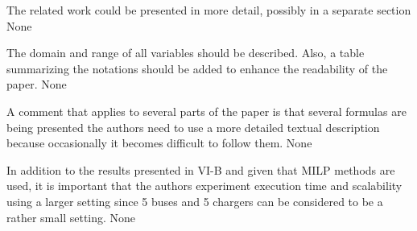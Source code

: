 \documentclass{article}
\begin{document}
\begin{buttkissing}
	\reviewerclaims The related work could be presented in more detail, possibly in a separate section
	\kissbutt None 

	\reviewerclaims The domain and range of all variables should be described. Also, a table summarizing the notations should be added to enhance the readability of the paper.
	\kissbutt None

	\reviewerclaims A comment that applies to several parts of the paper is that several formulas are being presented the authors need to use a more detailed textual description because occasionally it becomes difficult to follow them.
	\kissbutt None

	\reviewerclaims In addition to the results presented in VI-B and given that MILP methods are used, it is important that the authors experiment execution time and scalability using a larger setting since 5 buses and 5 chargers can be considered to be a rather small setting.
	\kissbutt None
\end{buttkissing}
\end{document}
